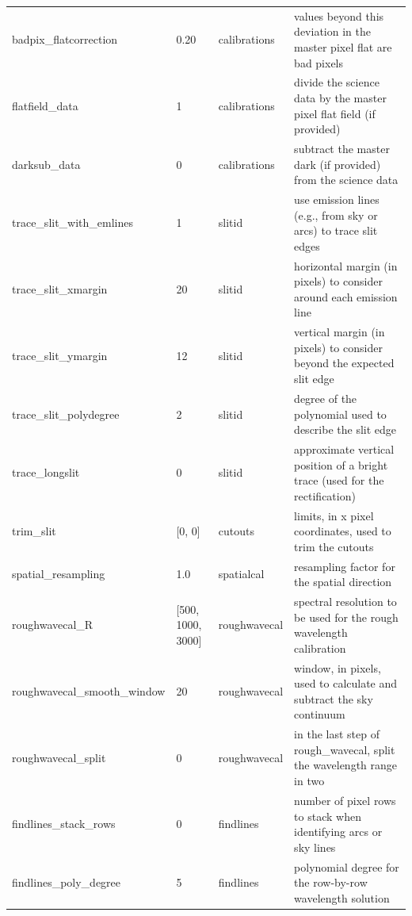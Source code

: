 \documentclass[a4paper]{article}
\begin{document}
\begin{sloppypar}
\begin{table}
{\begin{tabular}{llll}
    badpix\_flatcorrection        & 0.20          & calibrations     & values beyond this deviation in the master pixel flat are bad pixels \\
    flatfield\_data               & 1             & calibrations     & divide the science data by the master pixel flat field (if provided) \\
    darksub\_data                 & 0             & calibrations     & subtract the master dark (if provided) from the science data \\
    trace\_slit\_with\_emlines    & 1             & slitid           & use emission lines (e.g., from sky or arcs) to trace slit edges \\
    trace\_slit\_xmargin          & 20            & slitid           & horizontal margin (in pixels) to consider around each emission line \\
    trace\_slit\_ymargin          & 12            & slitid           & vertical margin (in pixels) to consider beyond the expected slit edge \\
    trace\_slit\_polydegree       & 2             & slitid           & degree of the polynomial used to describe the slit edge \\
    trace\_longslit               & 0             & slitid           & approximate vertical position of a bright trace (used for the rectification) \\
    trim\_slit                    & [0, 0]        & cutouts          & limits, in x pixel coordinates, used to trim the cutouts \\
    spatial\_resampling           & 1.0           & spatialcal       & resampling factor for the spatial direction \\
    roughwavecal\_R               & [500, 1000, 3000] & roughwavecal & spectral resolution to be used for the rough wavelength calibration \\
    roughwavecal\_smooth\_window  & 20            & roughwavecal     & window, in pixels, used to calculate and subtract the sky continuum \\
    roughwavecal\_split           & 0             & roughwavecal     & in the last step of rough\_wavecal, split the wavelength range in two \\
    findlines\_stack\_rows        & 0             & findlines        & number of pixel rows to stack when identifying arcs or sky lines \\
    findlines\_poly\_degree       & 5             & findlines        & polynomial degree for the row-by-row wavelength solution \\

\end{tabular}}
\end{table}
\end{sloppypar}
\end{document}
